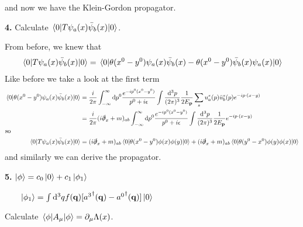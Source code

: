 \documentclass{article}
\newcommand{\intphead}[1]{\int\frac{\dd^3#1}{(2\pi)^3}}
\newcommand{\vbp}{\vb{p}}
\newcommand{\pars}{\slashed\partial}
\begin{document}
and now we have the Klein-Gordon propagator.


{\bf4.}\quad
Calculate $\mel{0}{T\psi_a(x)\bar\psi_b(x)}{0}$.

From before, we knew that
\begin{align*}
  \mel{0}{T\psi_a(x)\bar\psi_b(x)}{0}=\mel{0}{\theta(x^0-y^0)\psi_a(x)\bar\psi_b(x)-\theta(x^0-y^0)\bar\psi_b(x)\psi_a(x)}{0}
\end{align*}
Like before we take a look at the first term
\begin{align*}
  \mel{0}{\theta(x^0-y^0)\psi_a(x)\bar\psi_b(x)}{0}&=\frac{i}{2\pi}\int_{-\infty}^{\infty}\dd p^0\frac{e^{-ip^0(x^0-y^0)}}{p^0+i\epsilon}\intphead{p}\frac{1}{2E_{\vbp}}\sum_su^s_a(p)\bar u^s_b(p)e^{-ip\cdot(x-y)}\\
  &=\frac{i}{2\pi}(i\pars_x+m)_{ab}\int_{-\infty}^{\infty}\dd p^0\frac{e^{-ip^0(x^0-y^0)}}{p^0+i\epsilon}\intphead{p}\frac{1}{2E_{\vbp}}e^{-ip\cdot(x-y)}\\
  \intertext{so}
  \mel{0}{T\psi_a(x)\bar\psi_b(x)}{0}&=(i\pars_x+m)_{ab}\mel{0}{\theta(x^0-y^0)\phi(x)\phi(y)}{0}+(i\pars_x+m)_{ab}\mel{0}{\theta(y^0-x^0)\phi(y)\phi(x)}{0}
\end{align*}
and similarly we can derive the propagator.

{\bf5.}\quad
$\ket{\phi}=c_0\ket{0}+c_1\ket{\phi_1}$

    $\;\;\;\;\;\;\;\ket{\phi_1}=\int{\dd^3qf(\vb{q})[{a^3}^{\dagger}(\vb{q})-{a^0}^{\dagger}(\vb{q})]}\ket{0}$

    Calculate $\mel{\phi}{A_{\mu}}{\phi}=\partial_{\mu}\Lambda(x)$.
\end{document}
